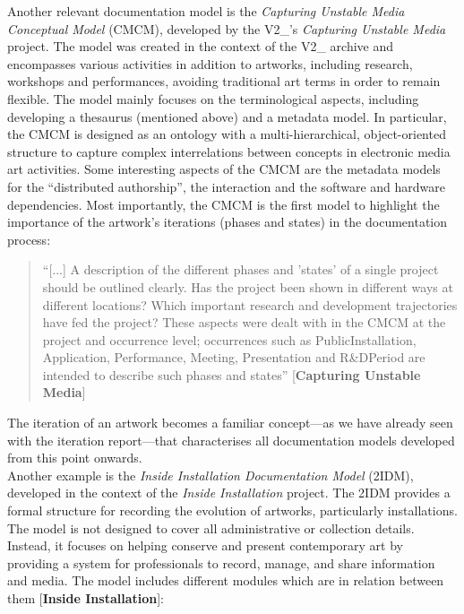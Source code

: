Another relevant documentation model is the \textit{Capturing Unstable Media Conceptual Model} (CMCM), developed by the V2\_'s \textit{Capturing Unstable Media} project. The model was created in the context of the V2\_ archive and encompasses various activities in addition to artworks, including research, workshops and performances, avoiding traditional art terms in order to remain flexible. The model mainly focuses on the terminological aspects, including developing a thesaurus (mentioned above) and a metadata model. In particular, the CMCM is designed as an ontology with a multi-hierarchical, object-oriented structure to capture complex interrelations between concepts in electronic media art activities. Some interesting aspects of the CMCM are the metadata models for the ``distributed authorship'', the interaction and the software and hardware dependencies. Most importantly, the CMCM is the first model to highlight the importance of the artwork’s iterations (phases and states) in the documentation process:
\begin{quote}
    “[...] A description of the different phases and 'states' of a single project should be outlined clearly. Has the project been shown in different ways at different locations? Which important research and development trajectories have fed the project? These aspects were dealt with in the CMCM at the project and occurrence level; occurrences such as PublicInstallation, Application, Performance, Meeting, Presentation and R&DPeriod are intended to describe such phases and states” [\textbf{Capturing Unstable Media}]
\end{quote}
The iteration of an artwork becomes a familiar concept—as we have already seen with the iteration report—that characterises all documentation models developed from this point onwards. \\
Another example is the \textit{Inside Installation Documentation Model} (2IDM), developed in the context of the \textit{Inside Installation} project. The 2IDM provides a formal structure for recording the evolution of artworks, particularly installations. The model is not designed to cover all administrative or collection details. Instead, it focuses on helping conserve and present contemporary art by providing a system for professionals to record, manage, and share information and media. 
The model includes different modules which are in relation between them [\textbf{Inside Installation}]:
